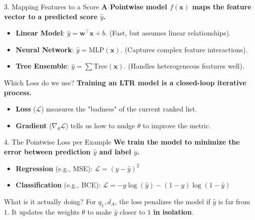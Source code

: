 \documentclass[aspectratio=169]{beamer}
\newif\ifanimated
\newcommand{\cpause}{\ifanimated\pause\fi}
\begin{document}
\begin{frame}{3. Mapping Features to a Score}
\textbf{A Pointwise model $f(\mathbf{x})$ maps the feature vector to a predicted score $\hat{y}$.}

\vspace{0.8em}
\begin{itemize}
    \item \textbf{Linear Model}: $\hat{y} = \mathbf{w}^\top \mathbf{x} + b$. (Fast, but assumes linear relationships).
    \item \textbf{Neural Network}: $\hat{y} = \text{MLP}(\mathbf{x})$. (Captures complex feature interactions).
    \item \textbf{Tree Ensemble}: $\hat{y} = \sum \text{Tree}(\mathbf{x})$. (Handles heterogeneous features well).
\end{itemize}
\end{frame}



\begin{frame}{Which Loss do we use?}
\textbf{Training an LTR model is a closed-loop iterative process.}

\vspace{0.8em}
\begin{center}
\resizebox{0.9\textwidth}{!}{

}
\end{center}

\vspace{0.8em}
\begin{itemize}
    \item \textbf{Loss} ($\mathcal{L}$) measures the "badness" of the current ranked list.
    \item \textbf{Gradient} ($\nabla_\theta \mathcal{L}$) tells us how to nudge $\theta$ to improve the metric.
\end{itemize}
\end{frame}


\begin{frame}{4. The Pointwise Loss per Example}
\textbf{We train the model to minimize the error between prediction $\hat{y}$ and label $y$.}

\vspace{0.8em}
\begin{itemize}
    \item \textbf{Regression} (e.g., MSE): $\mathcal{L} = (y - \hat{y})^2$
    \cpause
    \item \textbf{Classification} (e.g., BCE): $\mathcal{L} = -y \log(\hat{y}) - (1-y)\log(1-\hat{y})$
\end{itemize}

\vspace{1em}
\cpause
\begin{block}{What is it actually doing?}
For $q_1, d_A$, the loss penalizes the model if $\hat{y}$ is far from $1$. It updates the weights $\theta$ to make $\hat{y}$ closer to $1$ \textbf{in isolation}.
\end{block}
\end{frame}
\end{document}
